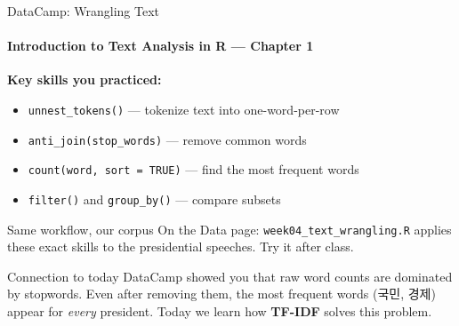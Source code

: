 \documentclass[aspectratio=169,11pt]{beamer}
\begin{document}
\begin{frame}{DataCamp: Wrangling Text}
    \framesubtitle{Introduction to Text Analysis in R --- Chapter 1}

    \textbf{Key skills you practiced:}
    \begin{itemize}
        \item \texttt{unnest\_tokens()} --- tokenize text into one-word-per-row
        \item \texttt{anti\_join(stop\_words)} --- remove common words
        \item \texttt{count(word, sort = TRUE)} --- find the most frequent words
        \item \texttt{filter()} and \texttt{group\_by()} --- compare subsets
    \end{itemize}

    \vspace{0.3cm}

    \begin{exampleblock}{Same workflow, our corpus}
        On the Data page: \texttt{week04\_text\_wrangling.R} applies these exact skills to the presidential speeches. Try it after class.
    \end{exampleblock}

    \vspace{0.3cm}

    \begin{alertblock}{Connection to today}
        DataCamp showed you that raw word counts are dominated by stopwords. Even after removing them, the most frequent words (국민, 경제) appear for \textit{every} president. Today we learn how \textbf{TF-IDF} solves this problem.
    \end{alertblock}
\end{frame}
\end{document}
